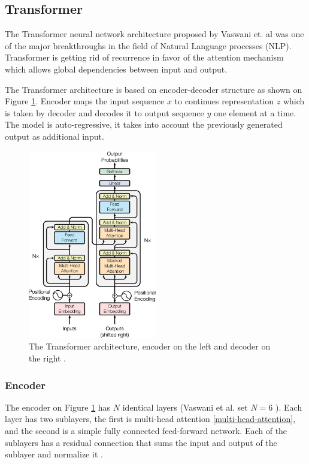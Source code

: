         \subsection{Transformer}\label{transformer}
        The Transformer neural network architecture proposed by Vaswani et. al \cite{attention-is-all} was one of the major breakthroughs in the field of Natural Language processes (NLP). Transformer is getting rid of recurrence \cite{lstm} in favor of the attention mechanism which allows global dependencies between input and output. 
        
        The Transformer architecture is based on encoder-decoder structure as shown on Figure \ref{fig:transformer}. Encoder maps the input sequence $x$ to continues representation $z$ which is taken by decoder and decodes it to output sequence $y$ one element at a time. The model is auto-regressive, it takes into account the previously generated output as additional input.
        
        \begin{figure}[ht]
            \centering
            \includegraphics[width=0.5\textwidth]{resources/theoretical-background/transformer-arch.jpeg}
            \caption{The Transformer architecture, encoder on the left and decoder on the right \cite{attention-is-all}.}
            \label{fig:transformer}
        \end{figure}
        
            \subsubsection{Encoder}
            The encoder on Figure \ref{fig:transformer} has $N$ identical layers (Vaswani et al. set $N=6$ \cite{attention-is-all}). Each layer has two sublayers, the first is multi-head attention \ref{multi-head-attention}, and the second is a simple fully connected feed-forward network. Each of the sublayers has a residual connection \cite{residual-connection} that sums the input and output of the sublayer and normalize it \cite{normalization}. 
            

